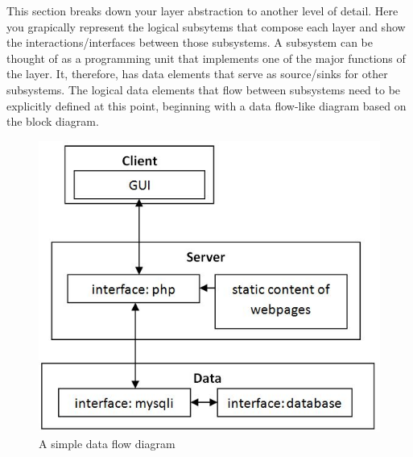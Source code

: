 This section breaks down your layer abstraction to another level of detail. Here you grapically represent the logical subsytems that compose each layer and show the interactions/interfaces between those subsystems. A subsystem can be thought of as a programming unit that implements one of the major functions of the layer. It, therefore, has data elements that serve as source/sinks for other subsystems. The logical data elements that flow between subsystems need to be explicitly defined at this point, beginning with a data flow-like diagram based on the block diagram.

\begin{figure}[h!]
	\centering
 	\includegraphics[width=\textwidth]{images/LayerBlockDiagramWithSubsystems}
 \caption{A simple data flow diagram}
\end{figure}

